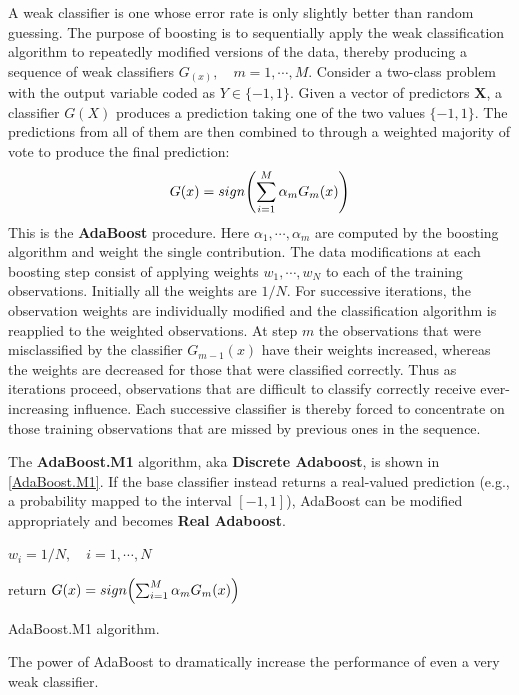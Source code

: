 \documentclass[12pt, letterpaper]{article}
\theoremstyle{definition}
\newcommand{\X}{\mathrm{\mathbf{X}}}
\DeclarePairedDelimiter\autobracket{(}{)}
\newcommand{\br}[1]{\autobracket*{#1}}
\begin{document}
A weak classifier is one whose error rate is only slightly better than random guessing. The purpose of boosting is to sequentially apply the weak classification algorithm to repeatedly modified versions of the data, thereby producing a sequence of weak classifiers $G_(x), \quad m=1,\cdots, M$. 
Consider a two-class problem with the output variable coded as $Y\in\{-1,1\}$. Given a vector of predictors $\X$, a classifier $G(X)$ produces a prediction taking one of the two values $\{-1,1\}$.
The predictions from all of them are then combined to through a weighted majority of vote to produce the final prediction:
\begin{equation}
G(x) = sign\br{\sum_{i=1}^M \alpha_mG_m(x)}
\end{equation}
This is the \textbf{AdaBoost} procedure. Here $\alpha_1, \cdots, \alpha_m$ are computed by the boosting algorithm and weight the single contribution. The data modifications at each boosting step consist of applying weights $w_1, \cdots, w_N$ to each of the training observations. Initially all the weights are $1/N$. For successive iterations,  the observation weights are individually modified and the classification algorithm is reapplied to the weighted observations. At step $m$ the observations that were misclassified by the classifier $G_{m-1}(x)$ have their weights increased, whereas the weights are decreased for those that were classified correctly. Thus as iterations proceed, observations that are difficult to classify correctly receive ever-increasing influence. Each successive classifier is thereby forced to concentrate on those training observations that are missed by previous ones in the sequence.
 
 The \textbf{AdaBoost.M1} algorithm, aka \textbf{Discrete Adaboost}, is shown in \ref{AdaBoost.M1}. If the base classifier instead returns a real-valued prediction (e.g., a probability mapped to the interval $[-1,1]$), AdaBoost can be modified appropriately and becomes \textbf{Real Adaboost}.
 \begin{algorithm}[!ht]
    $w_i=1/N, \quad i=1,\cdots,N$
    
		return $G(x) = sign\br{\sum_{i=1}^M \alpha_mG_m(x)}$
\caption{AdaBoost.M1 algorithm.}
\label{AdaBoost.M1}
\end{algorithm}
The power of AdaBoost to dramatically increase the performance of even a very weak classifier.
\end{document}

